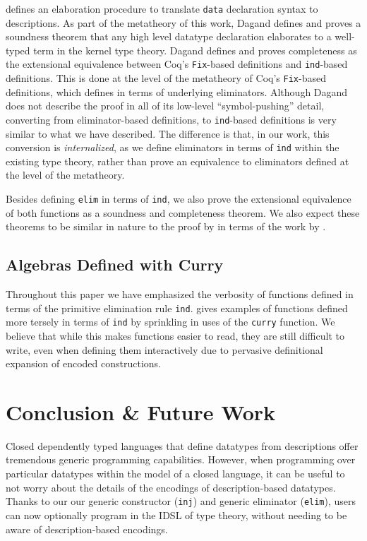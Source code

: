 \documentclass[nonatbib]{sigplanconf}
\begin{document}
\citet{dagand:phd} defines an elaboration procedure to translate
{\tt data} declaration syntax to descriptions. As part of the
metatheory of this work, Dagand defines and proves a soundness theorem
that any high level datatype declaration elaborates to a well-typed
term in the kernel type theory. Dagand defines and proves completeness as the
extensional equivalence between {\sc Coq}'s {\tt Fix}-based
definitions and {\tt ind}-based definitions. This is done at the level
of the metatheory of {\sc Coq}'s {\tt Fix}-based definitions, which
\citet{gimenez1995codifying} defines in terms of underlying
eliminators. Although Dagand does not describe the proof in all of its
low-level ``symbol-pushing'' detail, converting from
eliminator-based definitions, to {\tt ind}-based definitions is very similar
to what we have described. The difference is that, in our work, this
conversion is {\it internalized}, as we define eliminators in terms of
{\tt ind} within the existing type theory, rather than prove an
equivalence to eliminators defined at the level of the metatheory.

Besides defining {\tt elim} in terms of {\tt ind}, we also prove the
extensional equivalence of both functions as a soundness and
completeness theorem. We also expect these theorems to be similar in
nature to the proof by \citet{dagand:phd} in terms of the work by
\citet{gimenez1995codifying}.

\subsection{Algebras Defined with Curry}

Throughout this paper we have emphasized the verbosity of functions
defined in terms of the primitive elimination rule {\tt ind}.
\citet{mcbride2010ornamental} gives examples of functions defined more
tersely in terms of {\tt ind} by sprinkling in uses of the {\tt curry}
function. We believe that while this makes functions easier to
read, they are still difficult to write, even when defining them
interactively due to pervasive definitional expansion of encoded
constructions.

\section{Conclusion \& Future Work}
\label{sec:conclusion}

Closed dependently typed languages that define datatypes from
descriptions offer tremendous generic programming capabilities. 
However, when programming over particular datatypes within the model
of a closed language, it can be useful
to not worry about the details of the encodings of description-based
datatypes. Thanks to our our generic
constructor ({\tt inj}) and generic eliminator ({\tt elim}), users can
now optionally program in the IDSL of type theory, without needing to
be aware of description-based encodings.
\end{document}
